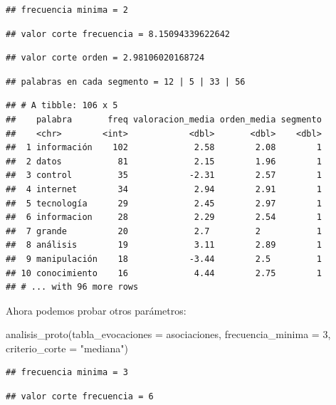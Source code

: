 \documentclass[
]{book}
\newenvironment{Shaded}{\begin{snugshade}}{\end{snugshade}}
\newcommand{\AttributeTok}[1]{\textcolor[rgb]{0.77,0.63,0.00}{#1}}
\newcommand{\DecValTok}[1]{\textcolor[rgb]{0.00,0.00,0.81}{#1}}
\newcommand{\FunctionTok}[1]{\textcolor[rgb]{0.00,0.00,0.00}{#1}}
\newcommand{\NormalTok}[1]{#1}
\newcommand{\StringTok}[1]{\textcolor[rgb]{0.31,0.60,0.02}{#1}}
\begin{document}
\begin{verbatim}
## frecuencia minima = 2
\end{verbatim}

\begin{verbatim}
## valor corte frecuencia = 8.15094339622642
\end{verbatim}

\begin{verbatim}
## valor corte orden = 2.98106020168724
\end{verbatim}

\begin{verbatim}
## palabras en cada segmento = 12 | 5 | 33 | 56
\end{verbatim}

\begin{verbatim}
## # A tibble: 106 x 5
##    palabra       freq valoracion_media orden_media segmento
##    <chr>        <int>            <dbl>       <dbl>    <dbl>
##  1 información    102             2.58        2.08        1
##  2 datos           81             2.15        1.96        1
##  3 control         35            -2.31        2.57        1
##  4 internet        34             2.94        2.91        1
##  5 tecnología      29             2.45        2.97        1
##  6 informacion     28             2.29        2.54        1
##  7 grande          20             2.7         2           1
##  8 análisis        19             3.11        2.89        1
##  9 manipulación    18            -3.44        2.5         1
## 10 conocimiento    16             4.44        2.75        1
## # ... with 96 more rows
\end{verbatim}

Ahora podemos probar otros parámetros:

\begin{Shaded}
\begin{Highlighting}[]
\FunctionTok{analisis\_proto}\NormalTok{(}\AttributeTok{tabla\_evocaciones =}\NormalTok{ asociaciones, }\AttributeTok{frecuencia\_minima =} \DecValTok{3}\NormalTok{, }\AttributeTok{criterio\_corte =} \StringTok{"mediana"}\NormalTok{)}
\end{Highlighting}
\end{Shaded}

\begin{verbatim}
## frecuencia minima = 3
\end{verbatim}

\begin{verbatim}
## valor corte frecuencia = 6
\end{verbatim}
\end{document}
